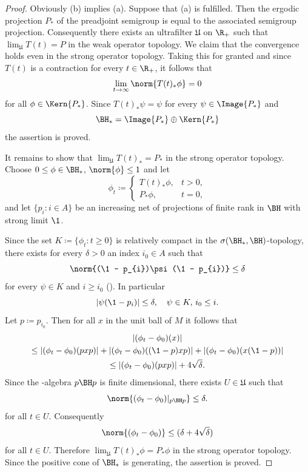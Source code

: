 \begin{proof}
Obviously (b) implies (a).
Suppose that (a) is fulfilled.
Then the ergodic projection $ P_{*} $  of the preadjoint semigroup is equal to the associated semigroup projection.
Consequently there exists an ultrafilter $ \mathfrak{U} $  on $ \R_{+} $  such that $ \lim_{\mathfrak{U}} T(t) = P $  in the weak operator topology.
We claim that the convergence holds even in the strong operator topology.
Taking this for granted and since $ T(t) $ is a contraction for every $ t \in \R_{+} $, it follows that
\[
\lim_{t \to \infty} \norm{T(t)_{*}\phi} = 0
\]
for all $ \phi \in \Kern{P_{*}} $.
Since $ T(t)_{*}\psi = \psi $  for every 
$ \psi \in \Image{P_{*}} $  and
\[
\BH_{*} = \Image{P_{*}} \oplus \Kern{P_{*}}
\]
the assertion is proved.

It remains to show that $ \lim_{\mathfrak{U}} T(t)_{*} = P_{*} $  in the strong operator topology.
Choose $ 0 \leq \phi \in \BH_{*} $, $ \norm{\phi} \leq 1 $  and let 
%
\[
	\phi_{t} \coloneqq 
	\begin{cases}
	T(t)_{*}\phi ,	&   t > 0 , \\
	P_{*}\phi	,	&   t = 0, 
	\end{cases} 
\]
%
and let $ \{p_{i}: i \in A\} $  be an increasing net of projections of finite rank in $ \BH $  with strong limit $\1$.

Since the set $ K \coloneqq \{\phi_{t}: t \geq 0\} $  is relatively compact in the $ \sigma(\BH_{*},\BH) $-topology, there exists for every $ \delta > 0 $  an index $ i_{0} \in A $  such that
\[
\norm{(\1 - p_{i})\psi(\1 - p_{i})} \leq \delta
\]
for every $ \psi \in K $  and $ i \geq i_{0} $  (\textcite[Theorem III.5.4.(vi)]{takesaki:1979}).
In particular
\[
|\psi(\1 - p_{i})| \leq \delta, \quad \psi \in K,\, i_{0} \leq i.
\]
Let $ p \coloneqq p_{i_{0}} $.
Then for all $ x $  in the unit ball of\/ $ M $  it follows that
\begin{gather*}
|(\phi_{t} - \phi_{0})(x)|  \\
\leq |(\phi_{t} - \phi_{0})(pxp)| 
     + |(\phi_{t} - \phi_{0})((\1-p)xp)| 
+ |(\phi_{t} - \phi_{0})(x(\1-p))| \\
     \leq 
 |(\phi_{t} - \phi_{0})(pxp)| + 4\sqrt{\delta} .
\end{gather*}
Since the \WA-algebra $ p \BH p $  is finite dimensional, there exists $ U \in \mathfrak{U} $  such that
\[
	\norm{(\phi_{t} - \phi_{0})\vert_{p \BH p} } \leq \delta .
\]
for all $ t \in U $.
Consequently
\[
\norm{(\phi_{t} - \phi_{0})} \leq (\delta + 4\sqrt{\delta})
\]
for all $ t \in U $.
Therefore $ \lim_{\mathfrak{U}} T(t)_{*}\phi = P_{*}\phi $  in the strong operator topology.
Since the positive cone of\/ $ \BH_{*} $  is generating, the assertion is proved.
\end{proof}
